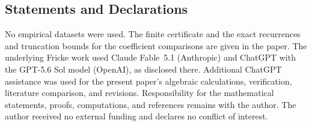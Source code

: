 \documentclass[11pt,reqno]{amsart}
\theoremstyle{remark}
\numberwithin{equation}{section}
\begin{document}
\begin{samepage}
\section*{Statements and Declarations}
No empirical datasets were used. The finite certificate and the exact
recurrences and truncation bounds for the coefficient comparisons are given
in the paper. The underlying Fricke work \cite{FrickeCompanion} used
Claude Fable~5.1 (Anthropic) and ChatGPT with the GPT-5.6 Sol model
(OpenAI), as disclosed there. Additional ChatGPT assistance was used for
the present paper's algebraic calculations, verification, literature
comparison, and revisions. Responsibility for the mathematical statements,
proofs, computations, and references remains with the author. The author
received no external funding and declares no conflict of interest.\par
\end{samepage}
\end{document}
